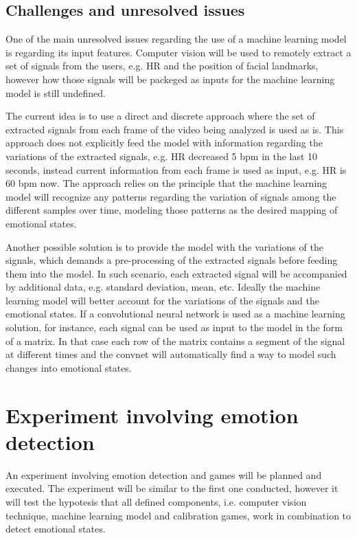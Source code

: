 \subsection{Challenges and unresolved issues}

One of the main unresolved issues regarding the use of a machine learning model is regarding its input features. Computer vision will be used to remotely extract a set of signals from the users, e.g. HR and the position of facial landmarks, however how those signals will be packeged as inputs for the machine learning model is still undefined.

The current idea is to use a direct and discrete approach where the set of extracted signals from each frame of the video being analyzed is used as is. This approach does not explicitly feed the model with information regarding the variations of the extracted signals, e.g. HR decreased 5 bpm in the last 10 seconds, instead current information from each frame is used as input, e.g. HR is 60 bpm now. The approach relies on the principle that the machine learning model will recognize any patterns regarding the variation of signals among the different samples over time, modeling those patterns as the desired mapping of emotional states.

Another possible solution is to provide the model with the variations of the signals, which demands a pre-processing of the extracted signals before feeding them into the model. In such scenario, each extracted signal will be accompanied by additional data, e.g. standard deviation, mean, etc. Ideally the machine learning model will better account for the variations of the signals and the emotional states. If a convolutional neural network is used as a machine learning solution, for instance, each signal can be used as input to the model in the form of a matrix. In that case each row of the matrix contains a segment of the signal at different times and the convnet will automatically find a way to model such changes into emotional states.

\section{Experiment involving emotion detection}
\label{closing:emotion-detection-experiment}

An experiment involving emotion detection and games will be planned and executed. The experiment will be similar to the first one conducted, however it will test the hypotesis that all defined components, i.e. computer vision technique, machine learning model and calibration games, work in combination to detect emotional states.


